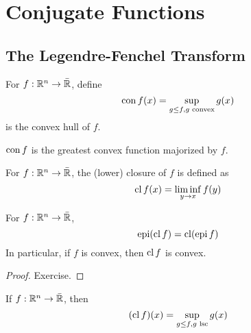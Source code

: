 
\chapter{Conjugate Functions}
\label{cha:conjugate-functions}

\section{The Legendre-Fenchel Transform}
\label{sec:legendre-fench-trans}

\begin{defn}
  \label{defn:conjugate_functions:1}
  For $f: \mathbb{R}^{n} \rightarrow \bar {\mathbb{R}}$, define
  \begin{equation}
    \label{eq:46}
    \operatorname*{con} f(x) = \sup_{g \leq f, \text{$g$ convex}} g(x)
  \end{equation} is the convex hull of $f$.
\end{defn}

\begin{proposition}
  $\operatorname*{con} f$ is the greatest convex function majorized by $f$.
\end{proposition}

\begin{defn}
  \label{defn:conjugate_functions:2}
  For $f: \mathbb{R}^{n} \rightarrow \bar {\mathbb{R}}$, the (lower) closure of $f$ is
  defined as
  \begin{equation}
    \label{eq:47}
    \operatorname*{cl} f(x) = \liminf_{y \rightarrow x} f(y)
  \end{equation}
\end{defn}

\begin{proposition}
  For $f: \mathbb{R}^{n} \rightarrow \bar {\mathbb{R}}$,
  \begin{equation}
    \label{eq:48}
    \operatorname*{epi} (\operatorname*{cl} f) = \operatorname*{cl} (\operatorname*{epi} f)
  \end{equation}
  In particular, if $f$ is convex, then $\operatorname*{cl} f$ is convex.
\end{proposition}

\begin{proof}
  Exercise.
\end{proof}

\begin{proposition}
  If $f: \mathbb{R}^{n} \rightarrow \bar {\mathbb{R}}$, then
  \begin{equation}
    \label{eq:49}
    (\operatorname*{cl} f)(x) = \sup_{g \leq f, \text{$g$ lsc}} g(x)
  \end{equation}
\end{proposition}

